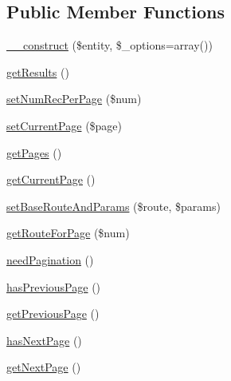 \subsection*{Public Member Functions}
\begin{DoxyCompactItemize}
\item 
\hyperlink{interfaceapp_1_1models_1_1core_1_1_pagination_1_1_paginable_interface_a30665d666343b7d0bc4205bbdd17a9a6}{\-\_\-\-\_\-construct} (\$entity, \$\-\_\-options=array())
\item 
\hyperlink{interfaceapp_1_1models_1_1core_1_1_pagination_1_1_paginable_interface_a3813247f2eae6ac65a8a021daf05bae4}{get\-Results} ()
\item 
\hyperlink{interfaceapp_1_1models_1_1core_1_1_pagination_1_1_paginable_interface_a729c58915f85c0640170ecd38bbbfbde}{set\-Num\-Rec\-Per\-Page} (\$num)
\item 
\hyperlink{interfaceapp_1_1models_1_1core_1_1_pagination_1_1_paginable_interface_a3d3907e74263fd57a5f8e42826a41741}{set\-Current\-Page} (\$page)
\item 
\hyperlink{interfaceapp_1_1models_1_1core_1_1_pagination_1_1_paginable_interface_a9613a9ee3ec2d3c253b6cacde84fb992}{get\-Pages} ()
\item 
\hyperlink{interfaceapp_1_1models_1_1core_1_1_pagination_1_1_paginable_interface_a1162a00ab3a7146680cf51a76bf60c78}{get\-Current\-Page} ()
\item 
\hyperlink{interfaceapp_1_1models_1_1core_1_1_pagination_1_1_paginable_interface_a1c8157c94169a4c1ba17e79947ccd619}{set\-Base\-Route\-And\-Params} (\$route, \$params)
\item 
\hyperlink{interfaceapp_1_1models_1_1core_1_1_pagination_1_1_paginable_interface_a8312f9c002ca2847db52142be1da09c7}{get\-Route\-For\-Page} (\$num)
\item 
\hyperlink{interfaceapp_1_1models_1_1core_1_1_pagination_1_1_paginable_interface_a3613a2a45ce883e2fae841ab26611473}{need\-Pagination} ()
\item 
\hyperlink{interfaceapp_1_1models_1_1core_1_1_pagination_1_1_paginable_interface_acb7ae38947e4e7f6f703ac7dcaea543e}{has\-Previous\-Page} ()
\item 
\hyperlink{interfaceapp_1_1models_1_1core_1_1_pagination_1_1_paginable_interface_a2ae421a6d6302fa4b340dce8127cad42}{get\-Previous\-Page} ()
\item 
\hyperlink{interfaceapp_1_1models_1_1core_1_1_pagination_1_1_paginable_interface_a5cbe0d19e29e1e5461e810ceeacc8f5a}{has\-Next\-Page} ()
\item 
\hyperlink{interfaceapp_1_1models_1_1core_1_1_pagination_1_1_paginable_interface_a6c0ee4e21328f53e8bea5675924f2d26}{get\-Next\-Page} ()
\end{DoxyCompactItemize}


